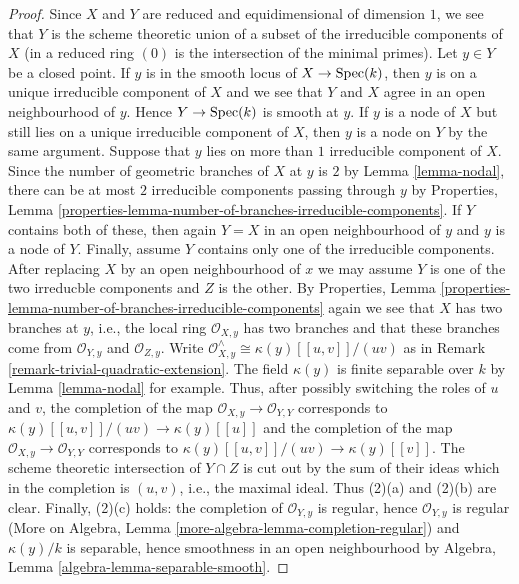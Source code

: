 \begin{proof}
Since $X$ and $Y$ are reduced and equidimensional of dimension $1$,
we see that $Y$ is the scheme theoretic union of a subset of the
irreducible components of $X$ (in a reduced ring $(0)$
is the intersection of the minimal primes).
Let $y \in Y$ be a closed point.
If $y$ is in the smooth locus of
$X \to \mathop{\mathrm{Spec}}(k)$, then $y$ is on a unique irreducible component
of $X$ and we see that $Y$ and $X$ agree in an open neighbourhood
of $y$. Hence $Y \to \mathop{\mathrm{Spec}}(k)$ is smooth at $y$.
If $y$ is a node of $X$ but still lies on a unique irreducible
component of $X$, then $y$ is a node on $Y$ by the same argument.
Suppose that $y$ lies on more than $1$ irreducible component of $X$.
Since the number of geometric branches of $X$ at $y$ is $2$
by Lemma \ref{lemma-nodal},
there can be at most $2$ irreducible components passing through $y$
by Properties, Lemma
\ref{properties-lemma-number-of-branches-irreducible-components}.
If $Y$ contains both of these, then again $Y = X$ in an open neighbourhood
of $y$ and $y$ is a node of $Y$. Finally, assume $Y$ contains only one
of the irreducible components. After replacing $X$ by an open
neighbourhood of $x$ we may assume $Y$ is one of the two
irreducble components and $Z$ is the other. By Properties, Lemma
\ref{properties-lemma-number-of-branches-irreducible-components}
again we see that $X$ has two branches at $y$, i.e., the local ring
$\mathcal{O}_{X, y}$ has two branches and that these branches
come from $\mathcal{O}_{Y, y}$ and $\mathcal{O}_{Z, y}$. Write
$\mathcal{O}_{X, y}^\wedge \cong \kappa(y)[[u, v]]/(uv)$
as in Remark \ref{remark-trivial-quadratic-extension}.
The field $\kappa(y)$ is finite separable over $k$ by
Lemma \ref{lemma-nodal} for example.
Thus, after possibly switching the roles of $u$ and $v$,
the completion of the map
$\mathcal{O}_{X, y} \to \mathcal{O}_{Y, Y}$
corresponds to $\kappa(y)[[u, v]]/(uv) \to \kappa(y)[[u]]$
and the completion of the map
$\mathcal{O}_{X, y} \to \mathcal{O}_{Y, Y}$
corresponds to $\kappa(y)[[u, v]]/(uv) \to \kappa(y)[[v]]$.
The scheme theoretic intersection of $Y \cap Z$ is cut out
by the sum of their ideas which in the completion is $(u, v)$, i.e.,
the maximal ideal. Thus (2)(a) and (2)(b) are clear.
Finally, (2)(c) holds: the completion of $\mathcal{O}_{Y, y}$
is regular, hence $\mathcal{O}_{Y, y}$ is regular
(More on Algebra, Lemma \ref{more-algebra-lemma-completion-regular})
and $\kappa(y)/k$ is separable, hence
smoothness in an open neighbourhood
by Algebra, Lemma \ref{algebra-lemma-separable-smooth}.
\end{proof}




